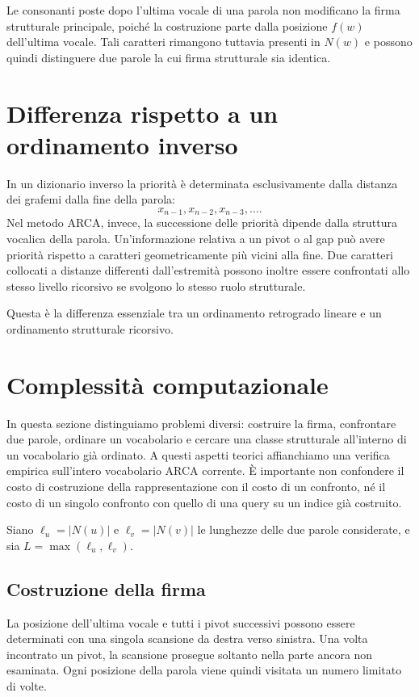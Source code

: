 \documentclass[11pt,a4paper]{article}
\theoremstyle{definition}
\theoremstyle{remark}
\newcommand{\Nrm}{N}
\begin{document}
Le consonanti poste dopo l'ultima vocale di una parola non modificano la firma strutturale principale, poiché la costruzione parte dalla posizione $f(w)$ dell'ultima vocale. Tali caratteri rimangono tuttavia presenti in $\Nrm(w)$ e possono quindi distinguere due parole la cui firma strutturale sia identica.

\section{Differenza rispetto a un ordinamento inverso}

In un dizionario inverso la priorità è determinata esclusivamente dalla distanza dei grafemi dalla fine della parola:
\[
  x_{n-1},x_{n-2},x_{n-3},\dots.
\]
Nel metodo ARCA, invece, la successione delle priorità dipende dalla struttura vocalica della parola. Un'informazione relativa a un pivot o al gap può avere priorità rispetto a caratteri geometricamente più vicini alla fine. Due caratteri collocati a distanze differenti dall'estremità possono inoltre essere confrontati allo stesso livello ricorsivo se svolgono lo stesso ruolo strutturale.

Questa è la differenza essenziale tra un ordinamento retrogrado lineare e un ordinamento strutturale ricorsivo.

\section{Complessità computazionale}

In questa sezione distinguiamo problemi diversi: costruire la firma, confrontare due parole, ordinare un vocabolario e cercare una classe strutturale all'interno di un vocabolario già ordinato. A questi aspetti teorici affianchiamo una verifica empirica sull'intero vocabolario ARCA corrente. È importante non confondere il costo di costruzione della rappresentazione con il costo di un confronto, né il costo di un singolo confronto con quello di una query su un indice già costruito.

Siano $\ell_u=|\Nrm(u)|$ e $\ell_v=|\Nrm(v)|$ le lunghezze delle due parole considerate, e sia $L=\max(\ell_u,\ell_v)$.

\subsection{Costruzione della firma}

La posizione dell'ultima vocale e tutti i pivot successivi possono essere determinati con una singola scansione da destra verso sinistra. Una volta incontrato un pivot, la scansione prosegue soltanto nella parte ancora non esaminata. Ogni posizione della parola viene quindi visitata un numero limitato di volte.
\end{document}
